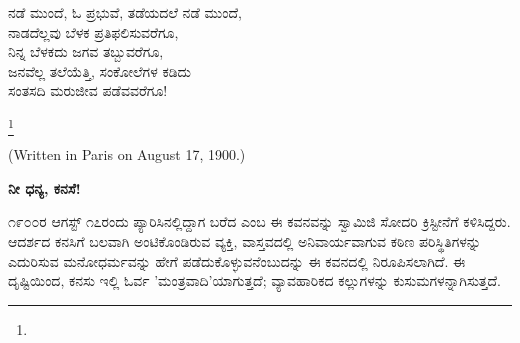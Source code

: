 \begin{myquote}
ನಡೆ ಮುಂದೆ, ಓ ಪ್ರಭುವೆ, ತಡೆಯದಲೆ ನಡೆ ಮುಂದೆ,\\ನಾಡದೆಲ್ಲವು ಬೆಳಕ ಪ್ರತಿಫಲಿಸುವರೆಗೂ,\\ನಿನ್ನ ಬೆಳಕದು ಜಗವ ತಬ್ಬುವರೆಗೂ,\\ಜನವೆಲ್ಲ ತಲೆಯೆತ್ತಿ, ಸಂಕೋಲೆಗಳ ಕಡಿದು\\ಸಂತಸದಿ ಮರುಜೀವ ಪಡೆವವರೆಗೂ!
\end{myquote}

\protect\footnote{}

\begin{center}
(Written in Paris on August 17, 1900.)
\end{center}

\begin{myquote}
\end{myquote}

\begin{myquote}
\end{myquote}

\begin{myquote}
\end{myquote}

\begin{center}
\textbf{ನೀ ಧನ್ಯ, ಕನಸೆ!}
\end{center}

೧೯೦೦ರ ಆಗಸ್ಟ್ ೧೭ರಂದು ಪ್ಯಾರಿಸಿನಲ್ಲಿದ್ದಾಗ ಬರೆದ  ಎಂಬ ಈ ಕವನವನ್ನು ಸ್ವಾಮಿಜಿ ಸೋದರಿ ಕ್ರಿಸ್ಟೀನೆಗೆ ಕಳಿಸಿದ್ದರು. ಆದರ್ಶದ ಕನಸಿಗೆ ಬಲವಾಗಿ ಅಂಟಿಕೊಂಡಿರುವ ವ್ಯಕ್ತಿ, ವಾಸ್ತವದಲ್ಲಿ ಅನಿವಾರ್ಯವಾಗುವ ಕಠಿಣ ಪರಿಸ್ಥಿತಿಗಳನ್ನು ಎದುರಿಸುವ ಮನೋಧರ್ಮವನ್ನು ಹೇಗೆ ಪಡೆದುಕೊಳ್ಳುವನೆಂಬುದನ್ನು ಈ ಕವನದಲ್ಲಿ ನಿರೂಪಿಸಲಾಗಿದೆ. ಈ ದೃಷ್ಟಿಯಿಂದ, ಕನಸು ಇಲ್ಲಿ ಓರ್ವ 'ಮಂತ್ರವಾದಿ'ಯಾಗುತ್ತದೆ; ವ್ಯಾವಹಾರಿಕದ ಕಲ್ಲುಗಳನ್ನು ಕುಸುಮಗಳನ್ನಾಗಿಸುತ್ತದೆ.

